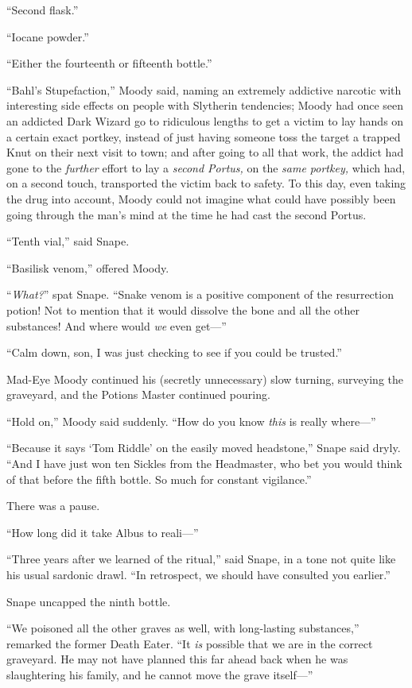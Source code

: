 “Second flask.”

“Iocane powder.”

“Either the fourteenth or fifteenth bottle.”

“Bahl’s Stupefaction,” Moody said, naming an extremely addictive narcotic with interesting side effects on people with Slytherin tendencies; Moody had once seen an addicted Dark Wizard go to ridiculous lengths to get a victim to lay hands on a certain exact portkey, instead of just having someone toss the target a trapped Knut on their next visit to town; and after going to all that work, the addict had gone to the \emph{further} effort to lay a \emph{second Portus,} on the \emph{same portkey,} which had, on a second touch, transported the victim back to safety. To this day, even taking the drug into account, Moody could not imagine what could have possibly been going through the man’s mind at the time he had cast the second Portus.

“Tenth vial,” said Snape.

“Basilisk venom,” offered Moody.

“\emph{What?}” spat Snape. “Snake venom is a positive component of the resurrection potion! Not to mention that it would dissolve the bone and all the other substances! And where would \emph{we} even get—”

“Calm down, son, I was just checking to see if you could be trusted.”

Mad-Eye Moody continued his (secretly unnecessary) slow turning, surveying the graveyard, and the Potions Master continued pouring.

“Hold on,” Moody said suddenly. “How do you know \emph{this} is really where—”

“Because it says ‘Tom Riddle’ on the easily moved headstone,” Snape said dryly. “And I have just won ten Sickles from the Headmaster, who bet you would think of that before the fifth bottle. So much for constant vigilance.”

There was a pause.

“How long did it take Albus to reali—”

“Three years after we learned of the ritual,” said Snape, in a tone not quite like his usual sardonic drawl. “In retrospect, we should have consulted you earlier.”

Snape uncapped the ninth bottle.

“We poisoned all the other graves as well, with long-lasting substances,” remarked the former Death Eater. “It \emph{is} possible that we are in the correct graveyard. He may not have planned this far ahead back when he was slaughtering his family, and he cannot move the grave itself—”

